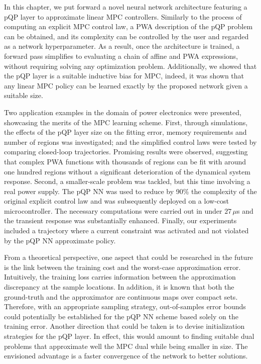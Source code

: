 In this chapter, we put forward a novel neural network architecture featuring a pQP layer to approximate linear MPC controllers. Similarly to the process of computing an explicit MPC control law, a PWA description of the pQP problem can be obtained, and its complexity can be controlled by the user and regarded as a network hyperparameter. As a result, once the architecture is trained, a forward pass simplifies to evaluating a chain of affine and PWA expressions, without requiring solving any optimization problem. Additionally, we showed that the pQP layer is a suitable inductive bias for MPC, indeed, it was shown that any linear MPC policy can be learned exactly by the proposed network given a suitable size.

Two application examples in the domain of power electronics were presented, showcasing the merits of the MPC learning scheme. First, through simulations, the effects of the pQP layer size on the fitting error, memory requirements and number of regions was investigated; and the simplified control laws were tested by comparing closed-loop trajectories. Promising results were observed, suggesting that complex PWA functions with thousands of regions can be fit with around one hundred regions without a significant deterioration of the dynamical system response. Second, a smaller-scale problem was tackled, but this time involving a real power supply. The pQP NN was used to reduce by 90\% the complexity of the original explicit control law and was subsequently deployed on a low-cost microcontroller. The necessary computations were carried out in under $27\,\mu$s and the transient response was substantially enhanced.  Finally, our experiments included a trajectory where a current constraint was activated and not violated by the pQP NN approximate policy.

From a theoretical perspective, one aspect that could be researched in the future is the link between the training cost and the worst-case approximation error. Intuitively, the training loss carries information between the approximation discrepancy at the sample locations. In addition, it is known that both the ground-truth and the approximator are continuous maps over compact sets. Therefore, with an appropriate sampling strategy, out-of-samples error bounds could potentially be established for the pQP NN scheme based solely on the training error. Another direction that could be taken is to devise initialization strategies for the pQP layer. In effect, this would amount to finding suitable dual problems that approximate well the MPC dual while being smaller in size. The envisioned advantage is a faster convergence of the network to better solutions.

